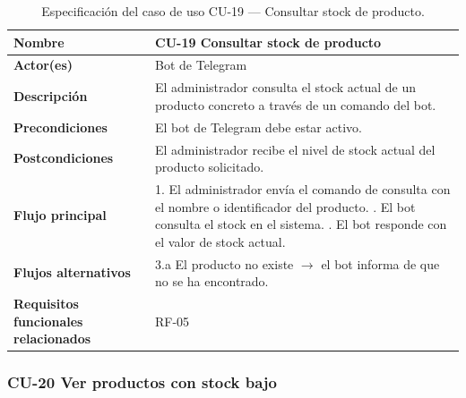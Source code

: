 \begin{table}[H]
\centering
\small
\begin{tabular}{|m{}|m{}|}
\hline
\textbf{Nombre} & CU-19 Consultar stock de producto \\ \hline
\textbf{Actor(es)} & Bot de Telegram \\ \hline
\textbf{Descripción} & El administrador consulta el stock actual de un producto concreto a través de un comando del bot. \\ \hline
\textbf{Precondiciones} & El bot de Telegram debe estar activo. \\ \hline
\textbf{Postcondiciones} & El administrador recibe el nivel de stock actual del producto solicitado. \\ \hline
\textbf{Flujo principal} & 1. El administrador envía el comando de consulta con el nombre o identificador del producto. \newline 2. El bot consulta el stock en el sistema. \newline 3. El bot responde con el valor de stock actual. \\ \hline
\textbf{Flujos alternativos} & 3.a El producto no existe $\rightarrow$ el bot informa de que no se ha encontrado. \\ \hline
\textbf{Requisitos funcionales relacionados} & RF-05 \\ \hline
\end{tabular}
\caption{Especificación del caso de uso CU-19 — Consultar stock de producto.}
\end{table}

\subsubsection{CU-20 Ver productos con stock bajo}


